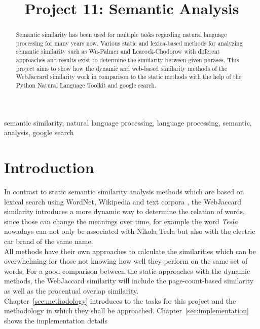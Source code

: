 \documentclass[conference]{IEEEtran}
\begin{document}
\title{Project 11: Semantic Analysis}

\author{
\and
{}
}

\maketitle

\begin{abstract}
Semantic similarity has been used for multiple tasks regarding natural language processing for many years now. Various static and lexica-based methods for analyzing semantic similarity such as Wu-Palmer and Leacock-Chodorow with different approaches and results exist to determine the similarity between given phrases. This project aims to show how the dynamic and web-based similarity methods of the WebJaccard similarity work in comparison to the static methods with the help of the Python Natural Language Toolkit and google search.
\end{abstract}

\begin{IEEEkeywords}
semantic similarity, natural language processing, language processing, semantic, analysis, google search
\end{IEEEkeywords}

\section{Introduction}

In contrast to static semantic similarity analysis methods which are based on lexical search using WordNet, Wikipedia and text corpora \cite{radinsky}, the WebJaccard similarity introduces a more dynamic way to determine the relation of words, since those can change the meanings over time, \cite{websim} for example the word \textit{Tesla} nowadays can not only be associated with Nikola Tesla but also with the electric car brand of the same name. \\All methods have their own approaches to calculate the similarities which can be overwhelming for those not knowing how well they perform on the same set of words. For a good comparison between the static approaches with the dynamic methods, the WebJaccard similarity will include the page-count-based similarity as well as the procentual overlap similarity.\\
Chapter~\ref{sec:methodology} introduces to the tasks for this project and the methodology in which they shall be approached. Chapter~\ref{sec:implementation} shows the implementation details 
\end{document}
